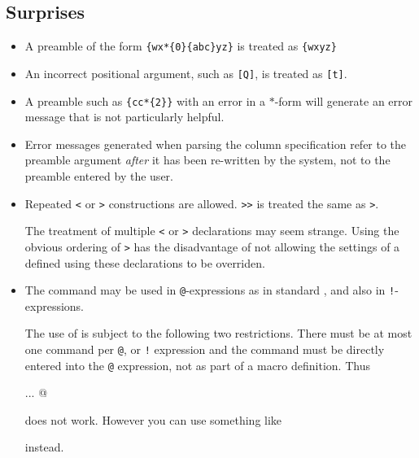 \subsection{Surprises}

 \begin{itemize}
 \item A preamble of the form \verb?{wx*{0}{abc}yz}? is treated as \verb?{wxyz}?

 \item An incorrect positional argument, such as \texttt{[Q]}, 
 is treated as \texttt{[t]}.

 \item A preamble such as \verb?{cc*{2}}? with an error in
 a $*$-form will generate an error message 
 that is not particularly helpful.

 \item Error messages generated when parsing the column specification
   refer to the preamble argument \emph{after} it has been re-written
   by the \cmd{\newcolumntype} system, not to the preamble entered by the
   user.  

 \item Repeated \texttt{<} or \texttt{>} constructions
 are allowed.  \texttt{>}\texttt{>}
 is treated the same as \texttt{>}.

   The treatment of multiple \texttt{<} or \texttt{>}
declarations may seem strange. Using the obvious ordering
of \texttt{>} has the disadvantage
of not allowing the settings of a  \cmd{\newcolumntype} 
defined using these declarations to be overriden.

 \item The \cmd{\extracolsep} command may be used in \texttt{@}-expressions 
 as in standard \ltx, and also in \texttt{!}-expressions.

   The use of \cmd{\extracolsep} is subject to the following
   two restrictions.  There must be at most one \cmd{\extracolsep}
   command per \texttt{@}, or \texttt{!} expression and the command must be
   directly entered into the \texttt{@} expression, not as part of a macro
   definition. Thus
\begin{lcode}
\newcommand{\ef}{\extracolsep{\fill}} ... @{\ef}
\end{lcode}
 does not work. However you can use
   something like
\begin{lcode}
\newcolumntype{e}{@{\extracolsep{\fill}}
\end{lcode}
instead.


\end{itemize}
